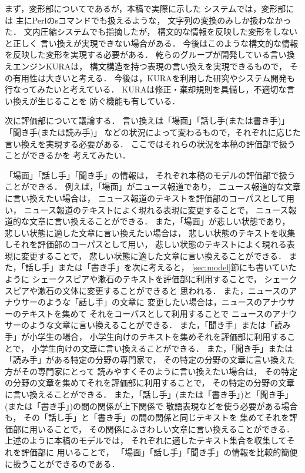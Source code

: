 まず，変形部についてであるが，本稿で実際に示した
システムでは，変形部には
主にPerlのsコマンドでも扱えるような，
文字列の変換のみしか扱わなかった．
文内圧縮システムでも指摘したが，
構文的な情報を反映した変形をしないと正しく
言い換えが実現できない場合がある．
今後はこのような構文的な情報を反映した変形を実現する必要がある．
乾らのグループが開発している言い換えエンジンKURA\cite{takashi_tl2001}は，
構文構造を持つ表現の言い換えを実現できるもので，
その有用性は大きいと考える．
今後は，KURAを利用した研究やシステム開発も行なってみたいと考えている．
KURAは修正・棄却規則を具備し，不適切な言い換えが生じることを
防ぐ機能も有している．

次に評価部について議論する．
言い換えは「場面」「話し手(または書き手)」「聞き手(または読み手)」
などの状況によって変わるもので，それぞれに応じた言い換えを実現する必要がある．
ここではそれらの状況を本稿の評価部で扱うことができるかを
考えてみたい．

「場面」「話し手」「聞き手」の情報は，
それぞれ本稿のモデルの評価部で扱うことができる．
例えば，「場面」がニュース報道であり，
ニュース報道的な文章に言い換えたい場合は，
ニュース報道のテキストを評価部のコーパスとして用い，
ニュース報道のテキストによく現れる表現に変更することで，
ニュース報道的な文章に言い換えることができる．
また，「場面」が悲しい状態であり，
悲しい状態に適した文章に言い換えたい場合は，
悲しい状態のテキストを収集しそれを評価部のコーパスとして用い，
悲しい状態のテキストによく現れる表現に変更することで，
悲しい状態に適した文章に言い換えることができる．
また，「話し手」または「書き手」を次に考えると，
\ref{sec:model}節にも書いていたように
シェークスピアや漱石のテキストを評価部に利用することで，
シェークスピアや漱石の文体に変更することができると
思われる．
また，ニュースのアナウサーのような「話し手」の文章に
変更したい場合は，ニュースのアナウサーのテキストを集めて
それをコーパスとして利用することで
ニュースのアナウサーのような文章に言い換えることができる．
また，「聞き手」または「読み手」が小学生の場合，
小学生向けのテキストを集めそれを評価部に利用することで，
小学生向けの文章に言い換えることができる．
また，「聞き手」または「読み手」がある特定の分野の専門家で，
その特定の分野の文章に言い換えた方がその専門家にとって
読みやすくそのように言い換えたい場合は，
その特定の分野の文章を集めてそれを評価部に利用することで，
その特定の分野の文章に言い換えることができる．
また，「話し手」(または「書き手」)と「聞き手」(または「書き手」)の間の関係が上下関係で
敬語表現などを使う必要がある場合も，
その「話し手」と「書き手」の間の関係と同じテキストを
集めてそれを評価部に用いることで，
その関係にふさわしい文章に言い換えることができる．
上述のように本稿のモデルでは，
それぞれに適したテキスト集合を収集してそれを評価部に
用いることで，
「場面」「話し手」「聞き手」の情報を比較的簡便に扱うことができるのである．

